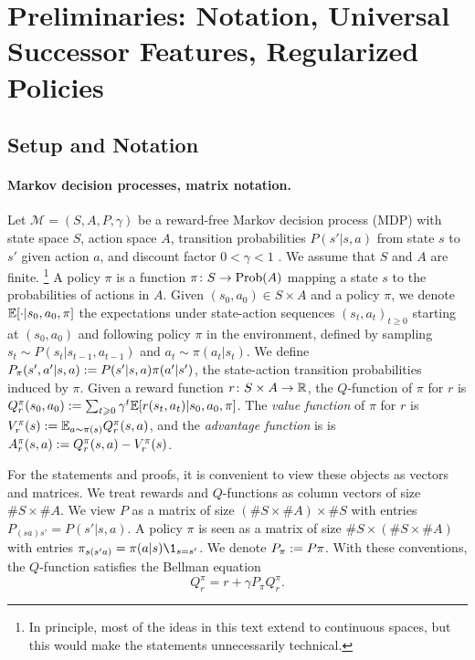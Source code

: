 \documentclass[11pt,a4paper]{article}
\begin{document}
\section{Preliminaries: Notation, Universal Successor Features,
Regularized Policies}


\subsection{Setup and Notation}

\paragraph{Markov decision processes, matrix notation.}
Let $\mathcal{M}=(S,A,P,\gamma)$ be
a reward-free Markov decision process (MDP)
with state space $S$, action space $A$, transition probabilities
$P(s'|s,a)$ from state $s$ to $s'$ given action $a$,
and discount factor $0 < \gamma < 1$ \cite{sutton2018reinforcement}. We
assume that 
$S$ and $A$ are finite. \footnote{In principle, most of the ideas in this text
extend to continuous spaces, but this would make the statements
unnecessarily technical.}
A policy $\pi$ is a function $\pi\colon S\to \mathrm{Prob}(A)$ mapping a
state $s$ to the probabilities of actions in $A$.
Given
$(s_0,a_0)\in S\times A$ and a policy $\pi$,
we denote $\mathbb{E}[\cdot|s_0,a_0,\pi]$ the
expectations under state-action sequences $(s_t,a_t)_{t
\geq 0}$ starting at $(s_0,a_0)$ and following policy $\pi$ in the
environment, defined by sampling $s_t\sim P( s_t|s_{t-1},a_{t-1})$ and
$a_t\sim \pi( a_t | s_t)$. We define $P_\pi(s', a' | s, a)
\mathrel{\mathop{:}}=
P( s'| s, a) \pi( a' | s')$, 
the state-action transition probabilities 
induced by $\pi$.  Given a reward
function $r\colon S\times A \to {\mathbb{R}}$, the $Q$-function of $\pi$ for $r$ is
$Q_r^\pi(s_0,a_0)\mathrel{\mathop{:}}= \sum_{t\geqslant 0} \gamma^t \mathbb{E}
[r(s_t,a_t)|s_0,a_0,\pi]$. The \emph{value function} of $\pi$ for $r$ is
$V_r^\pi(s)\mathrel{\mathop{:}}= \mathbb{E}_{a\sim \pi(s)} Q_r^\pi(s,a)$, and the
\emph{advantage function} is
is $A_r^\pi(s,a)\mathrel{\mathop{:}}= Q_r^\pi(s,a)-V_r^\pi(s)$.

For the statements and proofs, it is convenient to view these objects as
vectors and matrices. We treat rewards and $Q$-functions as column
vectors of size $\#S\times \#A$. We view $P$ as
a matrix of size $(\#S\times \#A)\times \#S$ with entries
$P_{(sa)s'}=P(s'|s,a)$. A policy $\pi$ is seen as a matrix of size
$\#S\times (\#S\times \#A)$ with entries
$\pi_{s(s'a)}=\pi(a|s)\1_{s=s'}$. 
We denote $P_{\pi}\mathrel{\mathop{:}}= P\pi$.
With these conventions, the
$Q$-function satisfies the Bellman equation
\begin{equation}
Q^\pi_r=r+\gamma P_\pi Q^{\pi}_r.
\end{equation}
\end{document}

